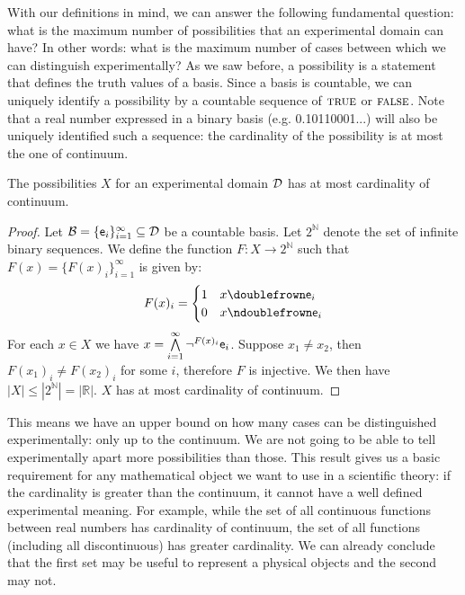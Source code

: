 \documentclass[11pt,letterpaper,fleqn]{memoir} %
\begin{document}
With our definitions in mind, we can answer the following fundamental question: what is the maximum number of possibilities that an experimental domain can have? In other words: what is the maximum number of cases between which we can distinguish experimentally? As we saw before, a possibility is a statement that defines the truth values of a basis. Since a basis is countable, we can uniquely identify a possibility by a countable sequence of $\TRUE$ or $\FALSE$. Note that a real number expressed in a binary basis (e.g. 0.10110001...) will also be uniquely identified such a sequence: the cardinality of the possibility is at most the one of continuum.

\begin{mathSection}
	\begin{thrm}
		The possibilities $X$ for an experimental domain $\edomain$ has at most cardinality of continuum.
	\end{thrm}
	
	\begin{proof}
		Let $\basis = \{\obs[e]_i\}_{i=1}^{\infty} \subseteq \edomain$ be a countable basis. Let $2^{\mathbb{N}}$ denote the set of infinite binary sequences. We define the function $F:X\to2^{\mathbb{N}}$ such that $F(x) = \{F(x)_i\}_{i=1}^{\infty}$ is given by: 
		$$
		F(x)_i = 
		\begin{cases}
		1 & x \comp \obs[e]_i \\
		0 & x \ncomp \obs[e]_i
		\end{cases}
		$$
		For each $x \in X$ we have $x = \bigAND\limits_{i=1}^{\infty} \NOT^{F(x)_i} \obs[e]_i$. Suppose $x_1 \neq x_2$, then $F(x_1)_i \neq F(x_2)_i$ for some $i$, therefore $F$ is injective. We then have $|X| \leq |2^{\mathbb{N}}|=|\mathbb{R}|$. $X$ has at most cardinality of continuum.
	\end{proof}
\end{mathSection}

This means we have an upper bound on how many cases can be distinguished experimentally: only up to the continuum. We are not going to be able to tell experimentally apart more possibilities than those. This result gives us a basic requirement for any mathematical object we want to use in a scientific theory: if the cardinality is greater than the continuum, it cannot have a well defined experimental meaning. For example, while the set of all continuous functions between real numbers has cardinality of continuum, the set of all functions (including all discontinuous) has greater cardinality. We can already conclude that the first set may be useful to represent a physical objects and the second may not.
\end{document}
